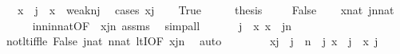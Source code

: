 \begin{isabellebody}
\ \ \ {\isachardoublequoteopen}x\ {\isacharless}{\kern0pt}\ j\ {\isasymor}\ x\ {\isasymin}\ weak{\isacharparenleft}{\kern0pt}n{\isacharcomma}{\kern0pt}j{\isacharparenright}{\kern0pt}{\isachardoublequoteclose}\ \isanewline
%
\isadelimproof
%
\endisadelimproof
%
\isatagproof
{}\isamarkupfalse%
\ {\isacharparenleft}{\kern0pt}cases\ {\isachardoublequoteopen}x{\isacharless}{\kern0pt}j{\isachardoublequoteclose}{\isacharparenright}{\kern0pt}\isanewline
\ \ \isamarkupfalse%
\ True\isanewline
\ \ \isamarkupfalse%
\ \isamarkupfalse%
\ {\isacharquery}{\kern0pt}thesis\ \isacommand{{\isachardot}{\kern0pt}{\isachardot}{\kern0pt}}\isamarkupfalse%
\isanewline
{}\isamarkupfalse%
\isanewline
\ \ \isamarkupfalse%
\ False\isanewline
\ \ \isamarkupfalse%
\ {\isachardoublequoteopen}x{\isasymin}nat{\isachardoublequoteclose}\ {\isachardoublequoteopen}j{\isacharhash}{\kern0pt}{\isacharplus}{\kern0pt}n{\isasymin}nat{\isachardoublequoteclose}\isanewline
\ \ \ \ \isamarkupfalse%
\ in{\isacharunderscore}{\kern0pt}n{\isacharunderscore}{\kern0pt}in{\isacharunderscore}{\kern0pt}nat{\isacharbrackleft}{\kern0pt}OF\ {\isacharunderscore}{\kern0pt}\ {\isacartoucheopen}x{\isasymin}j{\isacharhash}{\kern0pt}{\isacharplus}{\kern0pt}n{\isacartoucheclose}{\isacharbrackright}{\kern0pt}\ assms\ \isamarkupfalse%
\ simp{\isacharunderscore}{\kern0pt}all\isanewline
\ \ \isamarkupfalse%
\isanewline
\ \ \isamarkupfalse%
\ {\isachardoublequoteopen}j\ {\isasymle}\ x{\isachardoublequoteclose}\ {\isachardoublequoteopen}x\ {\isacharless}{\kern0pt}\ j{\isacharhash}{\kern0pt}{\isacharplus}{\kern0pt}n{\isachardoublequoteclose}\ \isanewline
\ \ \ \ \isamarkupfalse%
\ not{\isacharunderscore}{\kern0pt}lt{\isacharunderscore}{\kern0pt}iff{\isacharunderscore}{\kern0pt}le\ False\ {\isacartoucheopen}j{\isasymin}nat{\isacartoucheclose}\ {\isacartoucheopen}n{\isasymin}nat{\isacartoucheclose}\ ltI{\isacharbrackleft}{\kern0pt}OF\ {\isacartoucheopen}x{\isasymin}j{\isacharhash}{\kern0pt}{\isacharplus}{\kern0pt}n{\isacartoucheclose}{\isacharbrackright}{\kern0pt}\ \isamarkupfalse%
\ auto\isanewline
\ \ \isamarkupfalse%
\ \isanewline
\ \ \isamarkupfalse%
\ {\isachardoublequoteopen}x{\isacharhash}{\kern0pt}{\isacharminus}{\kern0pt}j\ {\isacharless}{\kern0pt}\ {\isacharparenleft}{\kern0pt}j\ {\isacharhash}{\kern0pt}{\isacharplus}{\kern0pt}\ n{\isacharparenright}{\kern0pt}\ {\isacharhash}{\kern0pt}{\isacharminus}{\kern0pt}\ j{\isachardoublequoteclose}\ {\isachardoublequoteopen}x\ {\isacharequal}{\kern0pt}\ j\ {\isacharhash}{\kern0pt}{\isacharplus}{\kern0pt}\ {\isacharparenleft}{\kern0pt}x\ {\isacharhash}{\kern0pt}{\isacharminus}{\kern0pt}j{\isacharparenright}{\kern0pt}{\isachardoublequoteclose}\isanewline

\end{isabellebody}
